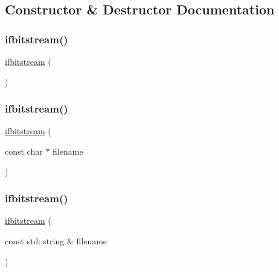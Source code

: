 \subsection{Constructor \& Destructor Documentation}
\mbox{\label{classifbitstream_a2d6148d42c4e6bcac770d185b25a691e}} 
\subsubsection{\texorpdfstring{ifbitstream()}{ifbitstream()}\hspace{0.1cm}{\footnotesize\ttfamily [1/3]}}
{\footnotesize\ttfamily \mbox{\hyperlink{classifbitstream}{ifbitstream}} (\begin{DoxyParamCaption}{ }\end{DoxyParamCaption})}

\mbox{\label{classifbitstream_a5fe2eb72a345e67256791c172a29bbba}} 
\subsubsection{\texorpdfstring{ifbitstream()}{ifbitstream()}\hspace{0.1cm}{\footnotesize\ttfamily [2/3]}}
{\footnotesize\ttfamily \mbox{\hyperlink{classifbitstream}{ifbitstream}} (\begin{DoxyParamCaption}\item[{const char $\ast$}]{filename }\end{DoxyParamCaption})}

\mbox{\label{classifbitstream_a96869868971e5d55945f1ab3d8bde584}} 
\subsubsection{\texorpdfstring{ifbitstream()}{ifbitstream()}\hspace{0.1cm}{\footnotesize\ttfamily [3/3]}}
{\footnotesize\ttfamily \mbox{\hyperlink{classifbitstream}{ifbitstream}} (\begin{DoxyParamCaption}\item[{const std\+::string \&}]{filename }\end{DoxyParamCaption})}



